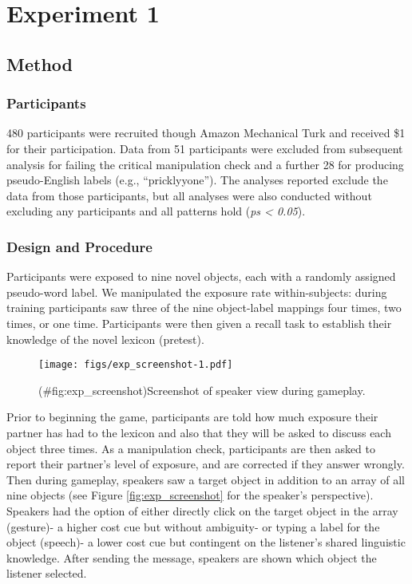 \documentclass[english,,man,floatsintext]{apa6}
\begin{document}
\hypertarget{experiment-1}{%
\section{Experiment 1}\label{experiment-1}}

\hypertarget{method}{%
\subsection{Method}\label{method}}

\hypertarget{participants-1}{%
\subsubsection{Participants}\label{participants-1}}

480 participants were recruited though Amazon Mechanical Turk and received \$1 for their participation. Data from 51 participants were excluded from subsequent analysis for failing the critical manipulation check and a further 28 for producing pseudo-English labels (e.g., \enquote{pricklyyone}). The analyses reported exclude the data from those participants, but all analyses were also conducted without excluding any participants and all patterns hold (\emph{ps \textless{} 0.05}).

\hypertarget{design-and-procedure}{%
\subsubsection{Design and Procedure}\label{design-and-procedure}}

Participants were exposed to nine novel objects, each with a randomly assigned pseudo-word label. We manipulated the exposure rate within-subjects: during training participants saw three of the nine object-label mappings four times, two times, or one time. Participants were then given a recall task to establish their knowledge of the novel lexicon (pretest).

\begin{figure}
\centering
\texttt{[image: figs/exp\_screenshot-1.pdf]}
\caption{(\#fig:exp\_screenshot)Screenshot of speaker view during gameplay.}
\end{figure}

Prior to beginning the game, participants are told how much exposure their partner has had to the lexicon and also that they will be asked to discuss each object three times. As a manipulation check, participants are then asked to report their partner's level of exposure, and are corrected if they answer wrongly. Then during gameplay, speakers saw a target object in addition to an array of all nine objects (see Figure \ref{fig:exp_screenshot} for the speaker's perspective). Speakers had the option of either directly click on the target object in the array (gesture)- a higher cost cue but without ambiguity- or typing a label for the object (speech)- a lower cost cue but contingent on the listener's shared linguistic knowledge. After sending the message, speakers are shown which object the listener selected.
\end{document}
